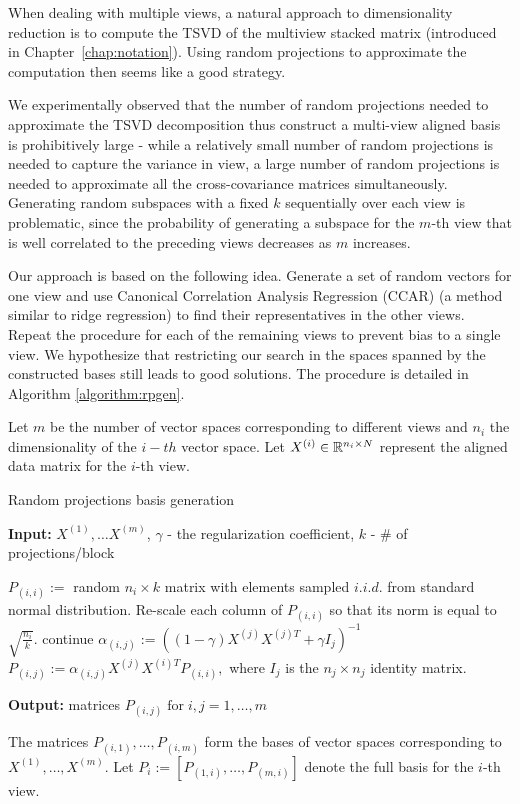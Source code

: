 When dealing with multiple views, a natural approach to 
dimensionality reduction is to compute the TSVD of the multiview stacked matrix (introduced in Chapter~\ref{chap:notation}).
Using random projections to approximate the computation then seems like
a good strategy.

We experimentally observed that the number of random projections needed to approximate 
the TSVD decomposition thus construct a multi-view aligned basis is prohibitively large - 
while a relatively small number of random projections is needed to capture the variance in view, a large
number of random projections is needed to approximate all the cross-covariance matrices simultaneously.
Generating random subspaces with a fixed $k$ sequentially over each view is problematic, since
the probability of generating a subspace for the $m$-th view that is well correlated to the preceding 
views decreases as $m$ increases.

Our approach is based on the following idea. Generate a set of random vectors for one view and use 
Canonical Correlation Analysis Regression (CCAR)\cite{ccar} (a method similar to ridge regression) 
to find their representatives in the other views. Repeat the procedure for each of the remaining views 
to prevent bias to a single view. We hypothesize that restricting our search in the spaces spanned 
by the constructed bases still leads to good solutions. The procedure is detailed in Algorithm \ref{algorithm:rpgen}.

Let $m$ be the number of vector spaces corresponding to different
views and $n_i$ the dimensionality of the $i-th$ vector
space. Let $X^{(i)} \in \mathbb{R}^{n_i \times N}$ represent the aligned
data matrix for the $i$-th view.


\begin{algorithm}
\caption{Random projections basis generation}
\label{algorithm:rpgen}
{\bf Input:} $X^{(1)},\ldots X^{(m)}$, $\gamma$ - the regularization coefficient, $k$ - \# of projections/block
\begin{algorithmic}
\STATE $P_{(i,i)} :=$ random $n_i \times k$ matrix with elements sampled $i.i.d.$ from standard normal distribution.
\STATE Re-scale each column of $P_{(i,i)}$ so that its norm is equal to $\sqrt{\frac{n_i}{k}}$.
 \STATE continue
\ENDIF
\STATE  $\alpha_{(i,j)} :=  \left(\left(1-\gamma\right) X^{(j)} X^{(j)T} + \gamma  I_j \right)^{-1}$
\STATE  $P_{(i,j)} :=  \alpha_{(i,j)} X^{(j)} X^{(i)T}  P_{(i,i)},$ where $I_j$ is the $n_j \times n_j$ identity matrix.
\ENDFOR
\ENDFOR
\\
\end{algorithmic}
{\bf Output:} matrices $P_{(i,j)} \;\text{for}\; i,j = 1,\ldots,m$
\end{algorithm}

The matrices $P_{(i,1)}, \ldots, P_{(i,m)}$ form the bases of
vector spaces corresponding to $X^{(1)},\ldots, X^{(m)}$. Let
$P_i := \left[P_{(1,i)}, \ldots, P_{(m,i)}\right]$ denote the full basis for
the $i$-th view.


